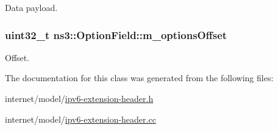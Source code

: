 Data payload. 

\subsubsection[{\texorpdfstring{m\+\_\+options\+Offset}{m_optionsOffset}}]{\setlength{\rightskip}{0pt plus 5cm}uint32\+\_\+t ns3\+::\+Option\+Field\+::m\+\_\+options\+Offset\hspace{0.3cm}{\ttfamily [private]}}\hypertarget{classns3_1_1OptionField_af4da0b51e27677c953ae9dac5aa911e7}{}\label{classns3_1_1OptionField_af4da0b51e27677c953ae9dac5aa911e7}


Offset. 



The documentation for this class was generated from the following files\+:\begin{DoxyCompactItemize}
\item 
internet/model/\hyperlink{ipv6-extension-header_8h}{ipv6-\/extension-\/header.\+h}\item 
internet/model/\hyperlink{ipv6-extension-header_8cc}{ipv6-\/extension-\/header.\+cc}\end{DoxyCompactItemize}
